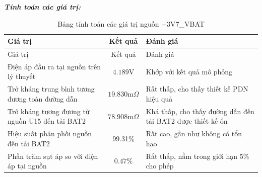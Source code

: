             \textbf{\textit{Tính toán các giá trị:}}
            \begin{longtable}{|p{}|c|p{}|}           
                \caption{Bảng tính toán các giá trị nguồn +3V7\_VBAT}\\
                \hline
                Giá trị & Kết quả & Đánh giá \\
                \hline
                \endfirsthead
                
                \hline
                Giá trị & Kết quả & Đánh giá \\
                \hline
                \endhead
                
                \hline
                \endfoot
                
                \hline
                \endlastfoot
                
                Điện áp đầu ra tại nguồn trên lý thuyết & $4.189\text{V}$ & Khớp với kết quả mô phỏng \\
                Trở kháng trung bình tương đương toàn đường dẫn & $19.830\text{m}\Omega$ & Rất thấp, cho thấy thiết kế PDN hiệu quả \\
                Trở kháng tương đương từ nguồn U15 đến tải BAT2 & $78.908\text{m}\Omega$ & Khá thấp, cho thấy đường dẫn đến tải BAT2 được thiết kế ổn \\
                Hiệu suất phân phối nguồn đến tải BAT2 & 99.31\% & Rất cao, gần như không có tổn hao \\
                Phần trăm sụt áp so với điện áp tại nguồn & $\mathbf{0.47\%}$ & Rất thấp, nằm trong giới hạn 5\% cho phép
                \label{tab:3v3_ctrl_calculation}\\

                \hline
            \end{longtable}
            
            